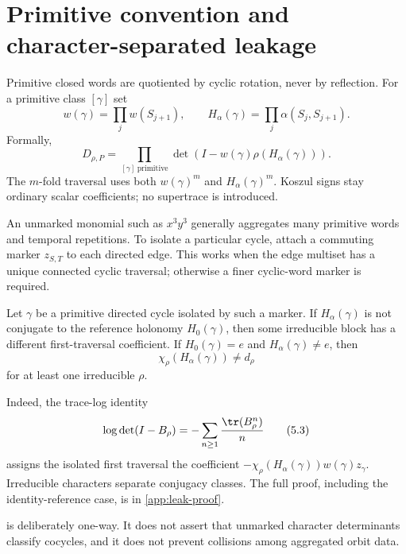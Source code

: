 \section{Primitive convention and character-separated leakage}
\label{sec:primitive}

Primitive closed words are quotiented by cyclic rotation, never by
reflection.  For a primitive class $[\gamma]$ set
\[
 w(\gamma)=\prod_j w(S_{j+1}),\qquad
 H_\alpha(\gamma)=\prod_j\alpha(S_j,S_{j+1}).
\]
Formally,
\[
 D_{\rho,P}
 =\prod_{[\gamma]\ \mathrm{primitive}}
   \det\!\left(I-w(\gamma)\rho(H_\alpha(\gamma))\right).
 \tag{5.1}\label{5.1}
\]
The $m$-fold traversal uses both $w(\gamma)^m$ and
$H_\alpha(\gamma)^m$.  Koszul signs stay ordinary scalar coefficients; no
supertrace is introduced.

An unmarked monomial such as $x^3y^3$ generally aggregates many primitive
words and temporal repetitions.  To isolate a particular cycle, attach a
commuting marker $z_{S,T}$ to each directed edge.  This works when the edge
multiset has a unique connected cyclic traversal; otherwise a finer
cyclic-word marker is required.

\begin{theorem}
\label{thm:separated-leak}
Let $\gamma$ be a primitive directed cycle isolated by such a marker.  If
$H_\alpha(\gamma)$ is not conjugate to the reference holonomy
$H_0(\gamma)$, then some irreducible block has a different first-traversal
coefficient.  If $H_0(\gamma)=e$ and $H_\alpha(\gamma)\ne e$, then
\[
 \chi_\rho(H_\alpha(\gamma))\ne d_\rho
 \tag{5.2}\label{5.2}
\]
for at least one irreducible $\rho$.
\end{theorem}

Indeed, the trace-log identity
\[
 \log\det(I-B_\rho)
 =-\sum_{n\ge1}\frac{\tr(B_\rho^n)}n
 \tag{5.3}\label{5.3}
\]
assigns the isolated first traversal the coefficient
$-\chi_\rho(H_\alpha(\gamma))w(\gamma)z_\gamma$.  Irreducible characters
separate conjugacy classes.  The full proof, including the identity-reference
case, is in \cref{app:leak-proof}.

 is deliberately one-way.  It does not assert that
unmarked character determinants classify cocycles, and it does not prevent
collisions among aggregated orbit data.
